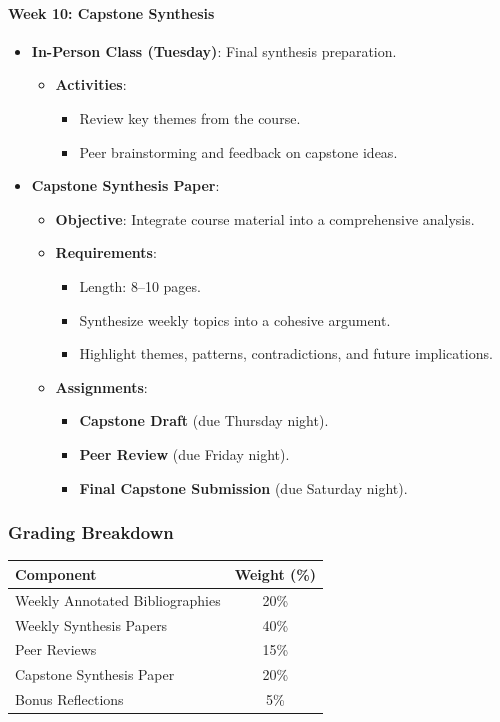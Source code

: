 \documentclass[11pt, letterpaper]{article}
\begin{document}
\paragraph{Week 10: Capstone Synthesis}
\begin{itemize}
    \item \textbf{In-Person Class (Tuesday)}: Final synthesis preparation.
    \begin{itemize}
        \item \textbf{Activities}:
        \begin{itemize}
            \item Review key themes from the course.
            \item Peer brainstorming and feedback on capstone ideas.
        \end{itemize}
    \end{itemize}
    \item \textbf{Capstone Synthesis Paper}:
    \begin{itemize}
        \item \textbf{Objective}: Integrate course material into a comprehensive analysis.
        \item \textbf{Requirements}:
        \begin{itemize}
            \item Length: 8–10 pages.
            \item Synthesize weekly topics into a cohesive argument.
            \item Highlight themes, patterns, contradictions, and future implications.
        \end{itemize}
        \item \textbf{Assignments}:
        \begin{itemize}
            \item \textbf{Capstone Draft} (due Thursday night).
            \item \textbf{Peer Review} (due Friday night).
            \item \textbf{Final Capstone Submission} (due Saturday night).
        \end{itemize}
    \end{itemize}
\end{itemize}

\subsubsection*{Grading Breakdown}
\begin{table}[h!]
\centering
\begin{tabular}{|l|c|}
\hline
\textbf{Component} & \textbf{Weight (\%)} \\
\hline
Weekly Annotated Bibliographies & 20\% \\
Weekly Synthesis Papers & 40\% \\
Peer Reviews & 15\% \\
Capstone Synthesis Paper & 20\% \\
Bonus Reflections & 5\% \\
\hline
\end{tabular}
\end{table}
\end{document}
